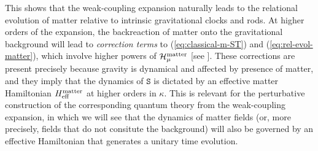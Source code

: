 \documentclass[12pt]{iopart}
\def\eref#1{(\ref{eq:#1})}
\def\S{\mathtt{S}}
\begin{document}
This shows that the weak-coupling expansion naturally leads to the relational evolution of matter relative to intrinsic gravitational clocks and rods. At higher orders of the expansion, the backreaction of matter onto the gravitational background will lead to \emph{correction terms} to \eref{classical-m-ST} and \eref{rel-evol-matter}, which involve higher powers of $\mathcal{H}_{\mu}^{\rm matter}$ [see \citet{kiefer1991quantum,Brizuela:2015tzl,Brizuela:2016gnz,Brizuela:2019jzv,Chataignier:2019psm,Chataignier:2020fap,Chataignier:2022iwb,Chataig:Thesis}]. These corrections are present precisely because gravity is dynamical and affected by presence of matter, and they imply that the dynamics of $\S$ is dictated by an effective matter Hamiltonian $H^{\rm matter}_{\rm eff}$ at higher orders in $\kappa$. This is relevant for the perturbative construction of the corresponding quantum theory from the weak-coupling expansion, in which we will see that the dynamics of matter fields (or, more precisely, fields that do not consitute the background) will also be governed by an effective Hamiltonian that generates a unitary time evolution.
\end{document}
